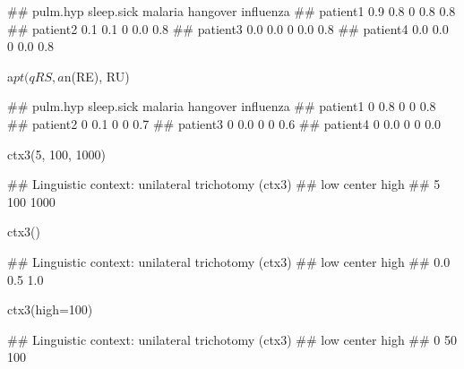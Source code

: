 \documentclass{article}\usepackage[]{graphicx}\usepackage[]{color}
\begin{document}
\begin{Schunk}
% --begin: "comp.quant.atleast"
\begin{Soutput}
##          pulm.hyp sleep.sick malaria hangover influenza
## patient1      0.9        0.8       0      0.8       0.8
## patient2      0.1        0.1       0      0.0       0.8
## patient3      0.0        0.0       0      0.0       0.8
## patient4      0.0        0.0       0      0.0       0.8
\end{Soutput}
%
% --end: "comp.quant.atleast"
\end{Schunk}

\begin{Schunk}
% --begin: "comp.quant.combined"
\begin{Sinput}
a$pt(qRS, a$n(RE), RU)
\end{Sinput}
\begin{Soutput}
##          pulm.hyp sleep.sick malaria hangover influenza
## patient1        0        0.8       0        0       0.8
## patient2        0        0.1       0        0       0.7
## patient3        0        0.0       0        0       0.6
## patient4        0        0.0       0        0       0.0
\end{Soutput}
%
% --end: "comp.quant.combined"
\end{Schunk}

\begin{Schunk}
% --begin: "ctx"
\begin{Sinput}
ctx3(5, 100, 1000)
\end{Sinput}
\begin{Soutput}
## Linguistic context: unilateral trichotomy (ctx3)
##    low center   high 
##      5    100   1000
\end{Soutput}
\begin{Sinput}
ctx3()
\end{Sinput}
\begin{Soutput}
## Linguistic context: unilateral trichotomy (ctx3)
##    low center   high 
##    0.0    0.5    1.0
\end{Soutput}
\begin{Sinput}
ctx3(high=100)
\end{Sinput}
\begin{Soutput}
## Linguistic context: unilateral trichotomy (ctx3)
##    low center   high 
##      0     50    100
\end{Soutput}
%
% --end: "ctx"
\end{Schunk}
\end{document}
